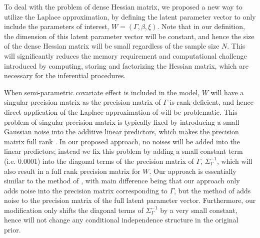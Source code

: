\documentclass[ba]{imsart}
\begin{document}
To deal with the problem of dense Hessian matrix, we proposed a new way to utilize the Laplace approximation, by defining the latent parameter vector to only include the parameters of interest, $W = (\Gamma, \beta, \xi)$. Note that in our definition, the dimension of this latent parameter vector will be constant, and hence the size of the dense Hessian matrix will be small regardless of the sample size $N$. This will significantly reduces the memory requirement and computational challenge introduced by computing, storing and factorizing the Hessian matrix, which are necessary for the inferential procedures. 

When semi-parametric covariate effect is included in the model, $W$ will have a singular precision matrix as the precision matrix of $\Gamma$ is rank deficient, and hence direct application of the Laplace approximation of \cite{tierney} will be problematic. This problem of singular precision matrix is typically fixed by introducing a small Gaussian noise into the additive linear predictors, which makes the precision matrix full rank \citep{casecross, inla}. In our proposed approach, no noises will be added into the linear predictors; instead we fix this problem by adding a small constant term (i.e. 0.0001) into the diagonal terms of the precision matrix of $\Gamma$, $\Sigma^{-1}_\Gamma$, which will also result in a full rank precision matrix for $W$. Our approach is essentially similar to the method of \cite{casecross,inla}, with main difference being that our approach only adds noise into the precision matrix corresponding to $\Gamma$, but the method of \cite{casecross,inla} adds noise to the precision matrix of the full latent parameter vector. Furthermore, our modification only shifts the diagonal terms of $\Sigma^{-1}_\Gamma$ by a very small constant, hence will not change any conditional independence structure in the original prior.
\end{document}
